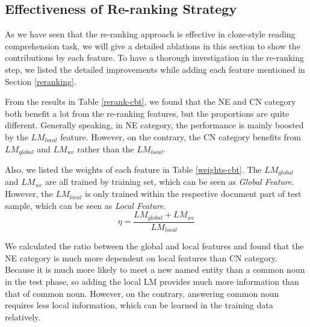 \documentclass[11pt,a4paper]{article}
\begin{document}
\subsection{Effectiveness of Re-ranking Strategy}        

As we have seen that the re-ranking approach is effective in cloze-style reading comprehension task, we will give a detailed ablations in this section to show the contributions by each feature.
To have a thorough investigation in the re-ranking step, we listed the detailed improvements while adding each feature mentioned in Section \ref{reranking}. 

From the results in Table \ref{rerank-cbt}, we found that the NE and CN category both benefit a lot from the re-ranking features, but the proportions are quite different.
Generally speaking, in NE category, the performance is mainly boosted by the $LM_{local}$ feature.
However, on the contrary, the CN category benefits from $LM_{global}$ and $LM_{wc}$ rather than the $LM_{local}$.
           
Also, we listed the weights of each feature in Table \ref{weights-cbt}. The $LM_{global}$ and $LM_{wc}$ are all trained by training set, which can be seen as {\em Global Feature}. However, the $LM_{local}$ is only trained within the respective document part of test sample, which can be seen as {\em Local Feature}. 
\begin{equation}
\eta = \frac{LM_{global} + LM_{wc}}{LM_{local}}
\end{equation}

We calculated the ratio between the global and local features and found that the NE category is much more dependent on local features than CN category. Because it is much more likely to meet a new named entity than a common noun in the test phase, so adding the local LM provides much more information than that of common noun. However, on the contrary, answering common noun requires less local information, which can be learned in the training data relatively.
\end{document}
